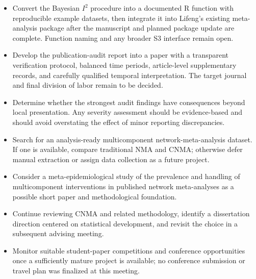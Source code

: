 \documentclass[11pt]{article}
\begin{document}
\begin{itemize}
    \item Convert the Bayesian $I^2$ procedure into a documented R function with reproducible example datasets, then integrate it into Lifeng's existing meta-analysis package after the manuscript and planned package update are complete. Function naming and any broader S3 interface remain open.

    \item Develop the publication-audit report into a paper with a transparent verification protocol, balanced time periods, article-level supplementary records, and carefully qualified temporal interpretation. The target journal and final division of labor remain to be decided.

    \item Determine whether the strongest audit findings have consequences beyond local presentation. Any severity assessment should be evidence-based and should avoid overstating the effect of minor reporting discrepancies.

    \item Search for an analysis-ready multicomponent network-meta-analysis dataset. If one is available, compare traditional NMA and CNMA; otherwise defer manual extraction or assign data collection as a future project.

    \item Consider a meta-epidemiological study of the prevalence and handling of multicomponent interventions in published network meta-analyses as a possible short paper and methodological foundation.

    \item Continue reviewing CNMA and related methodology, identify a dissertation direction centered on statistical development, and revisit the choice in a subsequent advising meeting.

    \item Monitor suitable student-paper competitions and conference opportunities once a sufficiently mature project is available; no conference submission or travel plan was finalized at this meeting.
\end{itemize}
\end{document}
